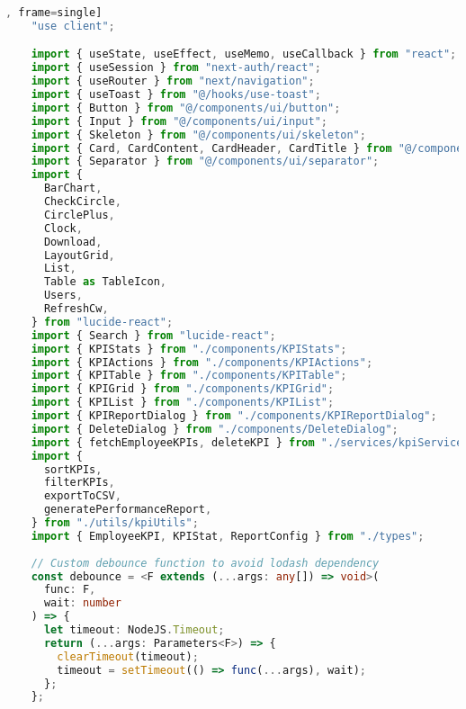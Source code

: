 \begin{lstlisting}[language=Typescript, caption=src/app/protected/kpi/page.tsx [front-end], frame=single]
    "use client";

    import { useState, useEffect, useMemo, useCallback } from "react";
    import { useSession } from "next-auth/react";
    import { useRouter } from "next/navigation";
    import { useToast } from "@/hooks/use-toast";
    import { Button } from "@/components/ui/button";
    import { Input } from "@/components/ui/input";
    import { Skeleton } from "@/components/ui/skeleton";
    import { Card, CardContent, CardHeader, CardTitle } from "@/components/ui/card";
    import { Separator } from "@/components/ui/separator";
    import {
      BarChart,
      CheckCircle,
      CirclePlus,
      Clock,
      Download,
      LayoutGrid,
      List,
      Table as TableIcon,
      Users,
      RefreshCw,
    } from "lucide-react";
    import { Search } from "lucide-react";
    import { KPIStats } from "./components/KPIStats";
    import { KPIActions } from "./components/KPIActions";
    import { KPITable } from "./components/KPITable";
    import { KPIGrid } from "./components/KPIGrid";
    import { KPIList } from "./components/KPIList";
    import { KPIReportDialog } from "./components/KPIReportDialog";
    import { DeleteDialog } from "./components/DeleteDialog";
    import { fetchEmployeeKPIs, deleteKPI } from "./services/kpiService";
    import {
      sortKPIs,
      filterKPIs,
      exportToCSV,
      generatePerformanceReport,
    } from "./utils/kpiUtils";
    import { EmployeeKPI, KPIStat, ReportConfig } from "./types";
    
    // Custom debounce function to avoid lodash dependency
    const debounce = <F extends (...args: any[]) => void>(
      func: F,
      wait: number
    ) => {
      let timeout: NodeJS.Timeout;
      return (...args: Parameters<F>) => {
        clearTimeout(timeout);
        timeout = setTimeout(() => func(...args), wait);
      };
    };
    

\end{lstlisting}
